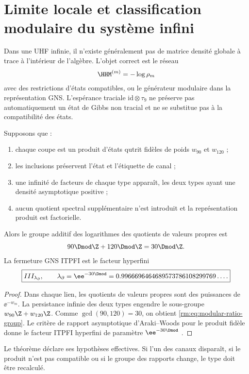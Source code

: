 \section{Limite locale et classification modulaire du système infini}

Dans une UHF infinie, il n’existe généralement pas de matrice densité globale à trace à l’intérieur de l’algèbre. L’objet correct est le réseau
\begin{equation}
\label{rm:eq:modular-local-net}
\HHM^{(m)}=-\log\rho_m
\end{equation}
avec des restrictions d’états compatibles, ou le générateur modulaire dans la représentation GNS. L’espérance traciale \(\mathrm{id}\otimes\tau_9\) ne préserve pas automatiquement un état de Gibbs non tracial et ne se substitue pas à la compatibilité des états.

\begin{theorem}
\label{rm:thm:modular-typeIII}
Supposons que :
\begin{enumerate}[label=(\roman*)]
\item chaque coupe est un produit d’états qutrit fidèles de poids \(w_{90}\) et \(w_{120}\) ;
\item les inclusions préservent l’état et l’étiquette de canal ;
\item une infinité de facteurs de chaque type apparaît, les deux types ayant une densité asymptotique positive ;
\item aucun quotient spectral supplémentaire n’est introduit et la représentation produit est factorielle.
\end{enumerate}
Alors le groupe additif des logarithmes des quotients de valeurs propres est
\begin{equation}
\label{rm:eq:modular-ratio-group}
90\Dmod\Z+120\Dmod\Z=30\Dmod\Z.
\end{equation}
La fermeture GNS ITPFI est le facteur hyperfini
\begin{equation}
\label{rm:eq:modular-typeIII-lambda}
\boxed{
III_{\lambda_\partial},
\qquad
\lambda_\partial=\ee^{-30\Dmod}
=0.9966696464689573786108299769\ldots .}
\end{equation}
\end{theorem}

\begin{proof}
Dans chaque lien, les quotients de valeurs propres sont des puissances de \(\ee^{-w_m}\). La persistance infinie des deux types engendre le sous-groupe \(w_{90}\Z+w_{120}\Z\). Comme \(\gcd(90,120)=30\), on obtient \cref{rm:eq:modular-ratio-group}. Le critère de rapport asymptotique d’Araki--Woods pour le produit fidèle donne le facteur ITPFI hyperfini de paramètre \(\ee^{-30\Dmod}\) \cite{rm:ArakiWoods1968,rm:Takesaki}.
\end{proof}

Le théorème déclare ses hypothèses effectives. Si l’un des canaux disparaît, si le produit n’est pas compatible ou si le groupe des rapports change, le type doit être recalculé.
